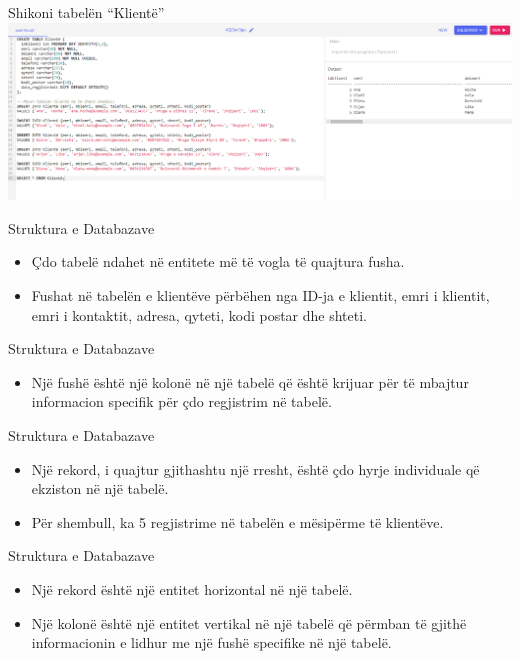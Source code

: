 \documentclass[
  ignorenonframetext,
]{beamer}
\providecommand{\tightlist}{%
  \setlength{\itemsep}{0pt}\setlength{\parskip}{0pt}}
\begin{document}
\begin{frame}{Shikoni tabelën ``Klientë''}
\label{shikoni-tabeluxebn-klientuxeb-1}
\includegraphics{./Figs/query1.png}
\end{frame}

\begin{frame}{Struktura e Databazave}
\label{struktura-e-databazave}
\begin{itemize}
\item
  Çdo tabelë ndahet në entitete më të vogla të quajtura fusha.
\item
  Fushat në tabelën e klientëve përbëhen nga ID-ja e klientit, emri i
  klientit, emri i kontaktit, adresa, qyteti, kodi postar dhe shteti.
\end{itemize}
\end{frame}

\begin{frame}{Struktura e Databazave}
\label{struktura-e-databazave-1}
\begin{itemize}
\tightlist
\item
  Një fushë është një kolonë në një tabelë që është krijuar për të
  mbajtur informacion specifik për çdo regjistrim në tabelë.
\end{itemize}
\end{frame}

\begin{frame}{Struktura e Databazave}
\label{struktura-e-databazave-2}
\begin{itemize}
\item
  Një rekord, i quajtur gjithashtu një rresht, është çdo hyrje
  individuale që ekziston në një tabelë.
\item
  Për shembull, ka 5 regjistrime në tabelën e mësipërme të klientëve.
\end{itemize}
\end{frame}

\begin{frame}{Struktura e Databazave}
\label{struktura-e-databazave-3}
\begin{itemize}
\item
  Një rekord është një entitet horizontal në një tabelë.
\item
  Një kolonë është një entitet vertikal në një tabelë që përmban të
  gjithë informacionin e lidhur me një fushë specifike në një tabelë.
\end{itemize}
\end{frame}
\end{document}
